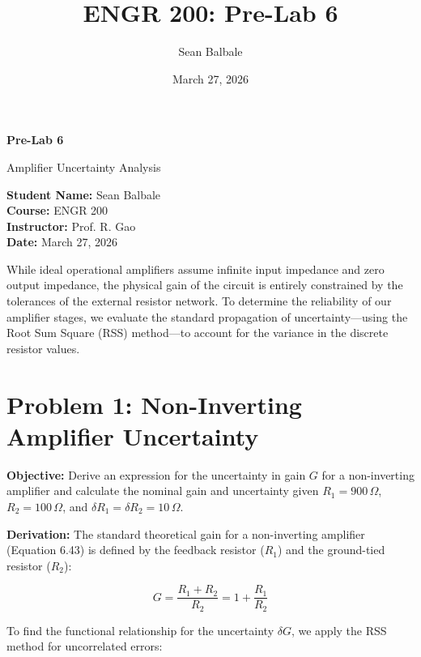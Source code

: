 \documentclass[11pt]{article}
\title{ENGR 200: Pre-Lab 6}
\author{Sean Balbale}
\date{March 27, 2026}
\begin{document}
\begin{titlepage}
  \begin{center}
    \vspace*{1in}

    \Huge
    \textbf{Pre-Lab 6}

    \LARGE
    Amplifier Uncertainty Analysis

    \vspace{3in}

    \textbf{Student Name:} Sean Balbale
    \\ \textbf{Course:} ENGR 200
    \\ \textbf{Instructor:} Prof. R. Gao
    \\ \textbf{Date:} March 27, 2026

    \vfill

  \end{center}
\end{titlepage}

\newpage

While ideal operational amplifiers assume infinite input impedance and zero output impedance, the physical gain of the circuit is entirely constrained by the tolerances of the external resistor network. To determine the reliability of our amplifier stages, we evaluate the standard propagation of uncertainty—using the Root Sum Square (RSS) method—to account for the variance in the discrete resistor values.

\section*{Problem 1: Non-Inverting Amplifier Uncertainty}

\textbf{Objective:} Derive an expression for the uncertainty in gain $G$ for a non-inverting amplifier and calculate the nominal gain and uncertainty given $R_1 = 900\,\Omega$, $R_2 = 100\,\Omega$, and $\delta R_1 = \delta R_2 = 10\,\Omega$.

\textbf{Derivation:}
The standard theoretical gain for a non-inverting amplifier (Equation 6.43) is defined by the feedback resistor ($R_1$) and the ground-tied resistor ($R_2$):

\[ G = \frac{R_1 + R_2}{R_2} = 1 + \frac{R_1}{R_2} \]

To find the functional relationship for the uncertainty $\delta G$, we apply the RSS method for uncorrelated errors:
\end{document}
